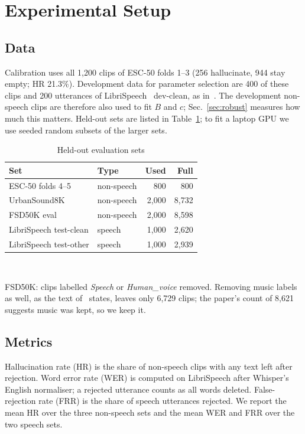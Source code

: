 \documentclass[conference,a4paper]{IEEEtran}
\begin{document}
\section{Experimental Setup}

\subsection{Data}
Calibration uses all 1,200 clips of ESC-50 folds 1--3 (256 hallucinate, 944 stay empty; HR 21.3\%). Development data for parameter selection are 400 of these clips and 200 utterances of LibriSpeech~\cite{panayotov2015librispeech} dev-clean, as in~\cite{abbasi2026hsp}. The development non-speech clips are therefore also used to fit $B$ and $c$; Sec.~\ref{sec:robust} measures how much this matters. Held-out sets are listed in Table~\ref{tab:data}; to fit a laptop GPU we use seeded random subsets of the larger sets.

\begin{table}[!t]
\centering
\caption{Held-out evaluation sets}
\label{tab:data}
\begin{tabular}{@{}llrr@{}}
\toprule
Set & Type & Used & Full \\
\midrule
ESC-50 folds 4--5~\cite{piczak2015esc} & non-speech & 800 & 800 \\
UrbanSound8K~\cite{salamon2014urbansound} & non-speech & 2,000 & 8,732 \\
FSD50K eval~\cite{fonseca2022fsd50k} & non-speech & 2,000 & 8,598 \\
LibriSpeech test-clean & speech & 1,000 & 2,620 \\
LibriSpeech test-other & speech & 1,000 & 2,939 \\
\bottomrule
\end{tabular}\\[3pt]
\parbox{0.95\columnwidth}{\footnotesize FSD50K: clips labelled \emph{Speech} or \emph{Human\_voice} removed. Removing music labels as well, as the text of~\cite{abbasi2026hsp} states, leaves only 6,729 clips; the paper's count of 8,621 suggests music was kept, so we keep it.}
\end{table}

\subsection{Metrics}
Hallucination rate (HR) is the share of non-speech clips with any text left after rejection. Word error rate (WER) is computed on LibriSpeech after Whisper's English normaliser; a rejected utterance counts as all words deleted. False-rejection rate (FRR) is the share of speech utterances rejected. We report the mean HR over the three non-speech sets and the mean WER and FRR over the two speech sets.
\end{document}
